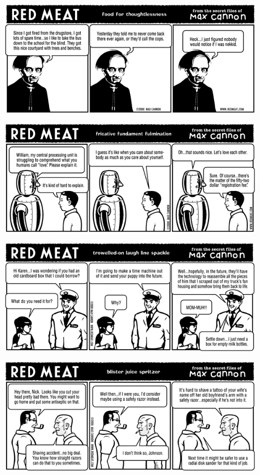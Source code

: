 \documentclass[a4paper,twoside,11pt]{article}
\begin{document}
\includegraphics[width=\textwidth]{redmeat_2000-10-24.png}



\includegraphics[width=\textwidth]{redmeat_2000-10-31.png}



\includegraphics[width=\textwidth]{redmeat_2000-11-07.png}



\includegraphics[width=\textwidth]{redmeat_2000-11-14.png}
\end{document}
